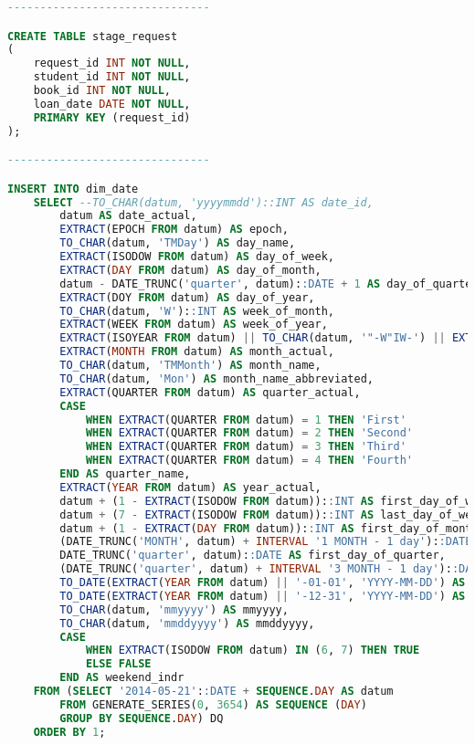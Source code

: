\begin{lstlisting}[language=SQL, caption={init.sql}, label={lst:init_sql}]
-------------------------------

CREATE TABLE stage_request
(
    request_id INT NOT NULL,
    student_id INT NOT NULL,
    book_id INT NOT NULL,
    loan_date DATE NOT NULL,
    PRIMARY KEY (request_id)
);

-------------------------------

INSERT INTO dim_date
    SELECT --TO_CHAR(datum, 'yyyymmdd')::INT AS date_id,
        datum AS date_actual,
        EXTRACT(EPOCH FROM datum) AS epoch,
        TO_CHAR(datum, 'TMDay') AS day_name,
        EXTRACT(ISODOW FROM datum) AS day_of_week,
        EXTRACT(DAY FROM datum) AS day_of_month,
        datum - DATE_TRUNC('quarter', datum)::DATE + 1 AS day_of_quarter,
        EXTRACT(DOY FROM datum) AS day_of_year,
        TO_CHAR(datum, 'W')::INT AS week_of_month,
        EXTRACT(WEEK FROM datum) AS week_of_year,
        EXTRACT(ISOYEAR FROM datum) || TO_CHAR(datum, '"-W"IW-') || EXTRACT(ISODOW FROM datum) AS week_of_year_iso,
        EXTRACT(MONTH FROM datum) AS month_actual,
        TO_CHAR(datum, 'TMMonth') AS month_name,
        TO_CHAR(datum, 'Mon') AS month_name_abbreviated,
        EXTRACT(QUARTER FROM datum) AS quarter_actual,
        CASE
            WHEN EXTRACT(QUARTER FROM datum) = 1 THEN 'First'
            WHEN EXTRACT(QUARTER FROM datum) = 2 THEN 'Second'
            WHEN EXTRACT(QUARTER FROM datum) = 3 THEN 'Third'
            WHEN EXTRACT(QUARTER FROM datum) = 4 THEN 'Fourth'
        END AS quarter_name,
        EXTRACT(YEAR FROM datum) AS year_actual,
        datum + (1 - EXTRACT(ISODOW FROM datum))::INT AS first_day_of_week,
        datum + (7 - EXTRACT(ISODOW FROM datum))::INT AS last_day_of_week,
        datum + (1 - EXTRACT(DAY FROM datum))::INT AS first_day_of_month,
        (DATE_TRUNC('MONTH', datum) + INTERVAL '1 MONTH - 1 day')::DATE AS last_day_of_month,
        DATE_TRUNC('quarter', datum)::DATE AS first_day_of_quarter,
        (DATE_TRUNC('quarter', datum) + INTERVAL '3 MONTH - 1 day')::DATE AS last_day_of_quarter,
        TO_DATE(EXTRACT(YEAR FROM datum) || '-01-01', 'YYYY-MM-DD') AS first_day_of_year,
        TO_DATE(EXTRACT(YEAR FROM datum) || '-12-31', 'YYYY-MM-DD') AS last_day_of_year,
        TO_CHAR(datum, 'mmyyyy') AS mmyyyy,
        TO_CHAR(datum, 'mmddyyyy') AS mmddyyyy,
        CASE
            WHEN EXTRACT(ISODOW FROM datum) IN (6, 7) THEN TRUE
            ELSE FALSE
        END AS weekend_indr
    FROM (SELECT '2014-05-21'::DATE + SEQUENCE.DAY AS datum
        FROM GENERATE_SERIES(0, 3654) AS SEQUENCE (DAY)
        GROUP BY SEQUENCE.DAY) DQ
    ORDER BY 1;


\end{lstlisting}
